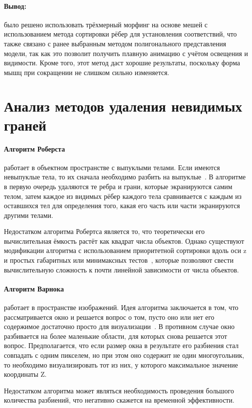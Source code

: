 \paragraph{Вывод:} было решено использовать трёхмерный морфинг на основе мешей с использованием метода сортировки рёбер для установления соответствий, что также связано с ранее выбранным методом полигонального представления модели, так как это позволит получить плавную анимацию с учётом освещения и видимости. Кроме того, этот метод даст хорошие результаты, поскольку форма мышц при сокращении не слишком сильно изменяется.

\section{Анализ методов удаления невидимых граней}
\label{sec:inv_edge}

\paragraph{Алгоритм Роберста} работает в объектном пространстве с выпуклыми телами. Если имеются невыпуклые тела, то их сначала необходимо разбить на выпуклые~\cite{rogers}. В алгоритме в первую очередь удаляются те ребра и грани, которые экранируются самим телом, затем каждое из видимых рёбер каждого тела сравнивается с каждым из оставшихся тел для определения того, какая его часть или части экранируются другими телами.
\par Недостатком алгоритма Робертса является то, что теоретически его вычислительная ёмкость растёт как квадрат числа объектов. Однако существуют модификации алгоритма с использованием приоритетной сортировки вдоль оси z и простых габаритных или минимаксных тестов~\cite{rogers}, которые позволяют свести вычислительную сложность к почти линейной зависимости от числа объектов.

\paragraph{Алгоритм Варнока} работает в пространстве изображений. Идея алгоритма заключается в том, что рассматривается окно и решается вопрос о том, пусто оно или нет его содержимое достаточно просто для визуализации~\cite{rogers}. В противном случае окно разбивается на более маленькие области, для которых снова решается этот вопрос. Предполагается, что если размер окна в результате его разбиения стал совпадать с одним пикселем, но при этом оно содержит не один многоугольник, то необходимо визуализировать тот из них, у которого максимальное значение координаты Z.
\par Недостатком алгоритма может являться необходимость проведения большого количества разбиений, что негативно скажется на временной эффективности.


